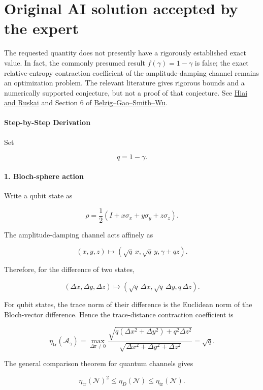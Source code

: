\documentclass[11pt]{article}
\begin{document}
\section*{Original AI solution accepted by the expert}
The requested quantity does not presently have a rigorously established exact value. In fact, the commonly presumed result $f(\gamma)=1-\gamma$ is false; the exact relative-entropy contraction coefficient of the amplitude-damping channel remains an optimization problem. The relevant literature gives rigorous bounds and a numerically supported conjecture, but not a proof of that conjecture. See \href{\detokenize{https://arxiv.org/abs/1508.03551}}{Hiai and Ruskai} and Section 6 of \href{\detokenize{https://arxiv.org/abs/2411.19890}}{Belzig--Gao--Smith--Wu}.

\paragraph*{Step-by-Step Derivation}

Set

\[
q=1-\gamma.
\]

\paragraph*{1. Bloch-sphere action}

Write a qubit state as

\[
\rho=\frac12\left(I+x\sigma_x+y\sigma_y+z\sigma_z\right).
\]

The amplitude-damping channel acts affinely as

\[
(x,y,z)\longmapsto
\left(\sqrt q\,x,\sqrt q\,y,\gamma+qz\right).
\]

Therefore, for the difference of two states,

\[
(\Delta x,\Delta y,\Delta z)
\longmapsto
\left(\sqrt q\,\Delta x,\sqrt q\,\Delta y,q\,\Delta z\right).
\]

For qubit states, the trace norm of their difference is the Euclidean norm of the Bloch-vector difference. Hence the trace-distance contraction coefficient is

\[
\eta_{\mathrm{tr}}(\mathcal A_\gamma)
=
\max_{\Delta\mathbf r\ne0}
\frac{\sqrt{q(\Delta x^2+\Delta y^2)+q^2\Delta z^2}}
{\sqrt{\Delta x^2+\Delta y^2+\Delta z^2}}
=\sqrt q.
\]

The general comparison theorem for quantum channels gives

\[
\eta_{\mathrm{tr}}(\mathcal N)^2
\leq
\eta_D(\mathcal N)
\leq
\eta_{\mathrm{tr}}(\mathcal N).
\]
\end{document}
